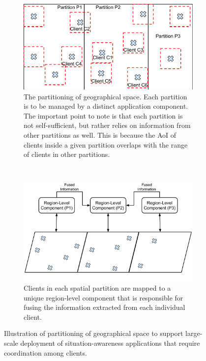 \begin{figure}
\centering
\begin{subfigure}{0.45\textwidth}
  \centering
  \includegraphics[width=\linewidth]{figures/mechanisms/spatial_ctx_mgmt/aoi_range_partition.pdf}
  \caption{The partitioning of geographical space. Each partition is to be managed by a distinct application component. The important point to note is that each partition is not self-sufficient, but rather relies on information from other partitions as well. This is because the AoI of clients inside a given partition overlaps with the range of clients in other partitions.}
  \label{fig:aoi_range_partition}
\end{subfigure}%
~~~
\begin{subfigure}{0.45\textwidth}
  \centering
  \includegraphics[width=\linewidth]{figures/mechanisms/spatial_ctx_mgmt/aoi_range_partition_mapping.pdf}
  \caption{Clients in each spatial partition are mapped to a unique region-level component that is responsible for fusing the information extracted from each individual client.}
  \label{fig:aoi_range_partition_mapping}
\end{subfigure}
\caption{Illustration of partitioning of geographical space to support large-scale deployment of situation-awareness applications that require coordination among clients.}
\label{fig:spatial_partitioning}
\end{figure}

